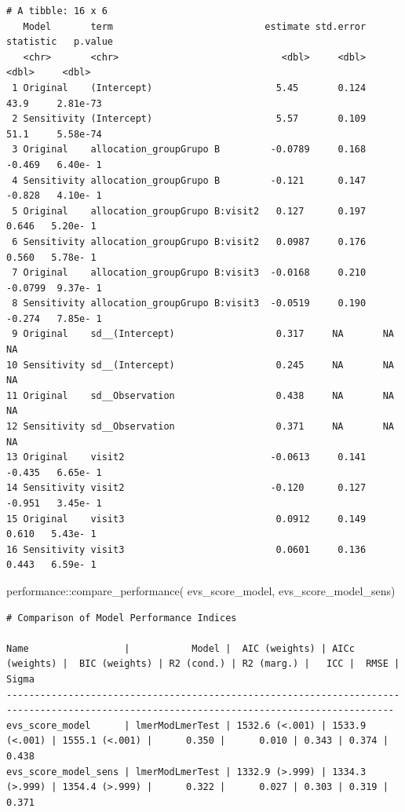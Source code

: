 \documentclass[
  12pt,
]{article}
\newenvironment{Shaded}{\begin{snugshade}}{\end{snugshade}}
\newcommand{\FunctionTok}[1]{\textcolor[rgb]{0.28,0.35,0.67}{#1}}
\newcommand{\NormalTok}[1]{\textcolor[rgb]{0.00,0.23,0.31}{#1}}
\newcommand{\SpecialCharTok}[1]{\textcolor[rgb]{0.37,0.37,0.37}{#1}}
\begin{document}
\begin{verbatim}
# A tibble: 16 x 6
   Model       term                           estimate std.error statistic   p.value
   <chr>       <chr>                             <dbl>     <dbl>     <dbl>     <dbl>
 1 Original    (Intercept)                      5.45       0.124   43.9     2.81e-73
 2 Sensitivity (Intercept)                      5.57       0.109   51.1     5.58e-74
 3 Original    allocation_groupGrupo B         -0.0789     0.168   -0.469   6.40e- 1
 4 Sensitivity allocation_groupGrupo B         -0.121      0.147   -0.828   4.10e- 1
 5 Original    allocation_groupGrupo B:visit2   0.127      0.197    0.646   5.20e- 1
 6 Sensitivity allocation_groupGrupo B:visit2   0.0987     0.176    0.560   5.78e- 1
 7 Original    allocation_groupGrupo B:visit3  -0.0168     0.210   -0.0799  9.37e- 1
 8 Sensitivity allocation_groupGrupo B:visit3  -0.0519     0.190   -0.274   7.85e- 1
 9 Original    sd__(Intercept)                  0.317     NA       NA      NA       
10 Sensitivity sd__(Intercept)                  0.245     NA       NA      NA       
11 Original    sd__Observation                  0.438     NA       NA      NA       
12 Sensitivity sd__Observation                  0.371     NA       NA      NA       
13 Original    visit2                          -0.0613     0.141   -0.435   6.65e- 1
14 Sensitivity visit2                          -0.120      0.127   -0.951   3.45e- 1
15 Original    visit3                           0.0912     0.149    0.610   5.43e- 1
16 Sensitivity visit3                           0.0601     0.136    0.443   6.59e- 1
\end{verbatim}

\begin{Shaded}
\begin{Highlighting}[]
\NormalTok{performance}\SpecialCharTok{::}\FunctionTok{compare\_performance}\NormalTok{(}
\NormalTok{    evs\_score\_model, }
\NormalTok{    evs\_score\_model\_sens) }
\end{Highlighting}
\end{Shaded}

\begin{verbatim}
# Comparison of Model Performance Indices

Name                 |           Model |  AIC (weights) | AICc (weights) |  BIC (weights) | R2 (cond.) | R2 (marg.) |   ICC |  RMSE | Sigma
-------------------------------------------------------------------------------------------------------------------------------------------
evs_score_model      | lmerModLmerTest | 1532.6 (<.001) | 1533.9 (<.001) | 1555.1 (<.001) |      0.350 |      0.010 | 0.343 | 0.374 | 0.438
evs_score_model_sens | lmerModLmerTest | 1332.9 (>.999) | 1334.3 (>.999) | 1354.4 (>.999) |      0.322 |      0.027 | 0.303 | 0.319 | 0.371
\end{verbatim}
\end{document}
